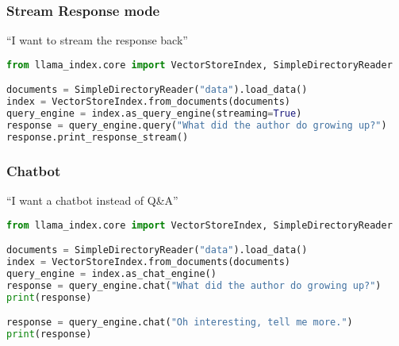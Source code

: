 \begin{frame}[fragile]\frametitle{Stream Response mode}

``I want to stream the response back''

\begin{lstlisting}[language=Python]
from llama_index.core import VectorStoreIndex, SimpleDirectoryReader

documents = SimpleDirectoryReader("data").load_data()
index = VectorStoreIndex.from_documents(documents)
query_engine = index.as_query_engine(streaming=True)
response = query_engine.query("What did the author do growing up?")
response.print_response_stream()
\end{lstlisting}
\end{frame}

\begin{frame}[fragile]\frametitle{Chatbot}

``I want a chatbot instead of Q\&A''

\begin{lstlisting}[language=Python]
from llama_index.core import VectorStoreIndex, SimpleDirectoryReader

documents = SimpleDirectoryReader("data").load_data()
index = VectorStoreIndex.from_documents(documents)
query_engine = index.as_chat_engine()
response = query_engine.chat("What did the author do growing up?")
print(response)

response = query_engine.chat("Oh interesting, tell me more.")
print(response)
\end{lstlisting}
\end{frame}